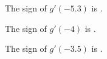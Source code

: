 \documentclass{ximera}
\begin{document}
\begin{exercise}
\begin{question}


The sign of $g'(-5.3)$ is .


\end{question}









\begin{question}


The sign of $g'(-4)$ is .


\end{question}









\begin{question}


The sign of $g'(-3.5)$ is .


\end{question}


\end{exercise}
\end{document}
